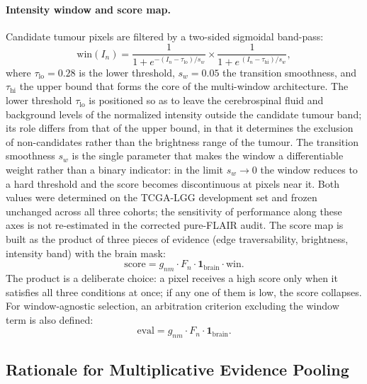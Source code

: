 \documentclass[11pt,a4paper]{article}
\begin{document}
\paragraph{Intensity window and score map.} Candidate tumour pixels are filtered
by a two-sided sigmoidal band-pass:
\begin{equation}
\mathrm{win}(I_n)=
\frac{1}{1+e^{-(I_n-\tau_{\text{lo}})/s_w}}
\times
\frac{1}{1+e^{\,(I_n-\tau_{\text{hi}})/s_w}},
\label{eq:win}
\end{equation}
where $\tau_{\text{lo}}=0.28$ is the lower threshold, $s_w=0.05$ the transition
smoothness, and $\tau_{\text{hi}}$ the upper bound that forms the core of the
multi-window architecture. The lower threshold $\tau_{\text{lo}}$ is positioned so
as to leave the cerebrospinal fluid and background levels of the normalized
intensity outside the candidate tumour band; its role differs from that of the
upper bound, in that it determines the exclusion of non-candidates rather than the
brightness range of the tumour. The transition smoothness $s_w$ is the single
parameter that makes the window a differentiable weight rather than a binary
indicator: in the limit $s_w\to0$ the window reduces to a hard threshold and the
score becomes discontinuous at pixels near it. Both values were determined on the
TCGA-LGG development set and frozen unchanged across all three cohorts; the
sensitivity of performance along these axes is not re-estimated in the corrected
pure-FLAIR audit. The score map is built as the product of three pieces
of evidence (edge traversability, brightness, intensity band) with the brain mask:
\begin{equation}
\mathrm{score}=g_{nm}\cdot F_n\cdot \mathbf{1}_{\text{brain}}\cdot \mathrm{win}.
\label{eq:score}
\end{equation}
The product is a deliberate choice: a pixel receives a high score only when it
satisfies all three conditions at once; if any one of them is low, the score
collapses. For window-agnostic selection, an arbitration criterion excluding the
window term is also defined:
\begin{equation}
\mathrm{eval}=g_{nm}\cdot F_n\cdot \mathbf{1}_{\text{brain}}.
\label{eq:eval}
\end{equation}

\subsection{Rationale for Multiplicative Evidence Pooling}\label{sec:score-rationale}
\end{document}

